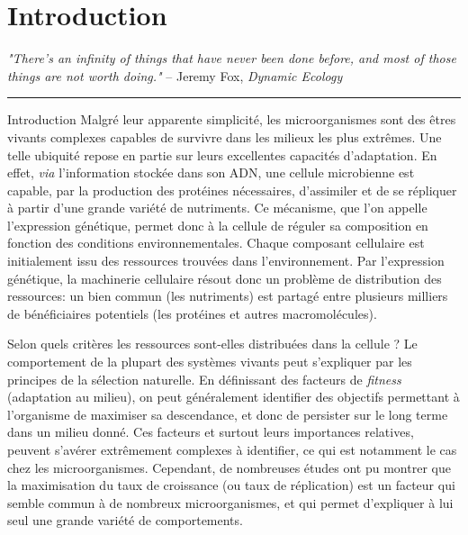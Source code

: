 \chapter{Introduction}
\label{chap:introduction}

\textit{"There's an infinity of things that have never been done before, and most of those things are not worth doing."} -- Jeremy Fox, \textit{Dynamic Ecology}~\cite{fox_how_2016}

\begin{center}
\noindent\rule{4cm}{0.1pt}
\end{center}

\begin{chapter_summary}{Introduction}
Malgré leur apparente simplicité, les microorganismes sont des êtres vivants complexes capables de survivre dans les milieux les plus extrêmes.
Une telle ubiquité repose en partie sur leurs excellentes capacités d'adaptation.
En effet, \textit{via} l'information stockée dans son ADN, une cellule microbienne est capable, par la production des protéines nécessaires, d'assimiler et de se répliquer à partir d'une grande variété de nutriments.
Ce mécanisme, que l'on appelle l'expression génétique, permet donc à la cellule de réguler sa composition en fonction des conditions environnementales.
Chaque composant cellulaire est initialement issu des ressources trouvées dans l'environnement.
Par l'expression génétique, la machinerie cellulaire résout donc un problème de distribution des ressources: un bien commun (les nutriments) est partagé entre plusieurs milliers de bénéficiaires potentiels (les protéines et autres macromolécules).

Selon quels critères les ressources sont-elles distribuées dans la cellule ?
Le comportement de la plupart des systèmes vivants peut s'expliquer par les principes de la sélection naturelle.
En définissant des facteurs de \textit{fitness} (adaptation au milieu), on peut généralement identifier des objectifs permettant à l'organisme de maximiser sa descendance, et donc de persister sur le long terme dans un milieu donné.
Ces facteurs et surtout leurs importances relatives, peuvent s'avérer extrêmement complexes à identifier, 
ce qui est notamment le cas chez les microorganismes.
Cependant, de nombreuses études ont pu montrer que la maximisation du taux de croissance (ou taux de réplication) est un facteur qui semble commun à de nombreux microorganismes, et qui permet d'expliquer à lui seul une grande variété de comportements.


\end{chapter_summary}
